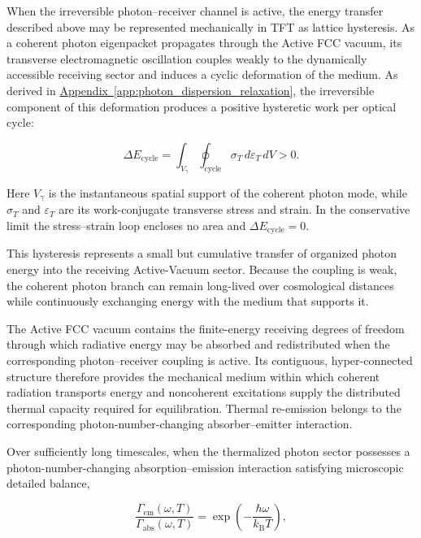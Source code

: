 \label{sec:lattice_hysteresis}

When the irreversible photon--receiver channel is active, the energy transfer described above may be represented mechanically in TFT as lattice hysteresis. As a coherent photon eigenpacket propagates through the Active FCC vacuum, its transverse electromagnetic oscillation couples weakly to the dynamically accessible receiving sector and induces a cyclic deformation of the medium. As derived in \hyperref[app:photon_dispersion_relaxation]{Appendix~\ref*{app:photon_dispersion_relaxation}}, the irreversible component of this deformation produces a positive hysteretic work per optical cycle:

\begin{equation}
    \Delta E_{\mathrm{cycle}}
    =
    \int_{V_\gamma}
    \oint_{\mathrm{cycle}}
    \sigma_T\,d\varepsilon_T\,dV
    > 0.
\end{equation}

Here $V_\gamma$ is the instantaneous spatial support of the coherent photon mode, while $\sigma_T$ and $\varepsilon_T$ are its work-conjugate transverse stress and strain. In the conservative limit the stress--strain loop encloses no area and $\Delta E_{\mathrm{cycle}}=0$.

This hysteresis represents a small but cumulative transfer of organized photon energy into the receiving Active-Vacuum sector. Because the coupling is weak, the coherent photon branch can remain long-lived over cosmological distances while continuously exchanging energy with the medium that supports it.

The Active FCC vacuum contains the finite-energy receiving degrees of freedom through which radiative energy may be absorbed and redistributed when the corresponding photon--receiver coupling is active. Its contiguous, hyper-connected structure therefore provides the mechanical medium within which coherent radiation transports energy and noncoherent excitations supply the distributed thermal capacity required for equilibration. Thermal re-emission belongs to the corresponding photon-number-changing absorber--emitter interaction.

Over sufficiently long timescales, when the thermalized photon sector possesses a photon-number-changing absorption--emission interaction satisfying microscopic detailed balance,

\begin{equation}
    \frac{
        \Gamma_{\mathrm{em}}(\omega,T)
    }{
        \Gamma_{\mathrm{abs}}(\omega,T)
    }
    =
    \exp\left(
        -\frac{\hbar\omega}{k_{\mathrm B}T}
    \right),
\end{equation}

